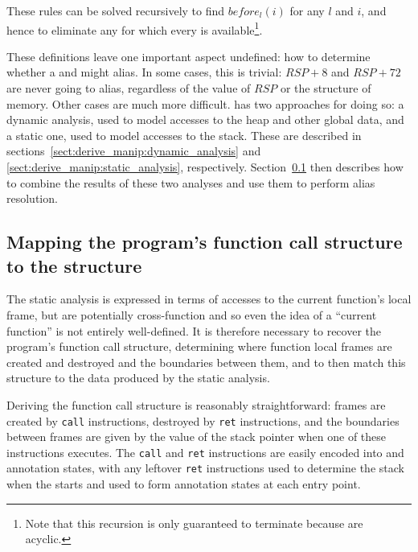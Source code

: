 These rules can be solved recursively to find $before_l(i)$ for any
$l$ and $i$, and hence to eliminate any  for which every
 is available\footnote{Note that this recursion is only
  guaranteed to terminate because {\StateMachines} are acyclic.}.

These definitions leave one important aspect undefined: how to
determine whether a  and  might alias.  In
some cases, this is trivial: $RSP+8$ and $RSP+72$ are never going to
alias, regardless of the value of $RSP$ or the structure of memory.
Other cases are much more difficult.  {\Technique} has two approaches
for doing so: a dynamic analysis, used to model accesses to the heap
and other global data, and a static one, used to model accesses to the
stack.  These are described in
sections~\ref{sect:derive_manip:dynamic_analysis} and
\ref{sect:derive_manip:static_analysis}, respectively.
Section~\ref{sect:derive_manip:synthesis_aliasing} then describes how
to combine the results of these two analyses and use them to perform
alias resolution.

\subsection{Mapping the program's function call structure to the {\StateMachine} structure}
\label{sect:derive_manip:synthesis_aliasing}

The static analysis is expressed in terms of accesses to the current
function's local frame, but {\StateMachines} are potentially
cross-function and so even the idea of a ``current function'' is not
entirely well-defined.  It is therefore necessary to recover the
program's function call structure, determining where function local
frames are created and destroyed and the boundaries between them, and
to then match this structure to the data produced by the static
analysis.

Deriving the function call structure is reasonably straightforward:
frames are created by \texttt{call} instructions, destroyed by
\texttt{ret} instructions, and the boundaries between frames are given
by the value of the stack pointer when one of these instructions
executes.  The \texttt{call} and \texttt{ret} instructions are easily
encoded into  and  annotation
states, with any leftover \texttt{ret} instructions used to determine
the stack when the {\StateMachine} starts and used to form
 annotation states at each entry
point.

